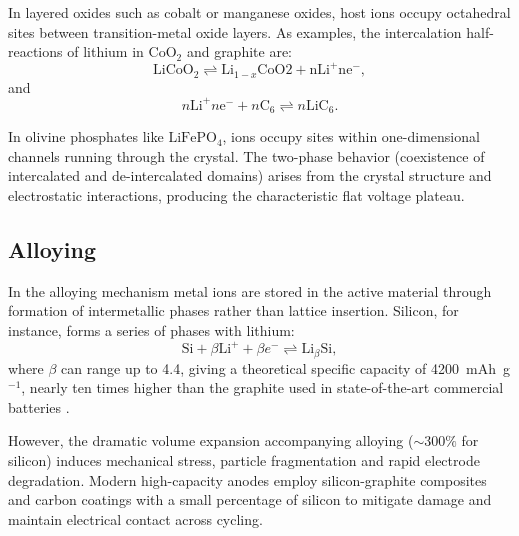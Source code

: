 In layered oxides such as cobalt or manganese oxides, host ions occupy octahedral sites between transition-metal oxide layers. 
As examples, the intercalation half-reactions of lithium in $\mathrm{CoO}_2$ and graphite are\cite{MIZUSHIMA1980783}:
\begin{equation}
    \mathrm{LiCoO}_2 \rightleftharpoons \mathrm{Li}_{1-x}\mathrm{CoO2 + n\mathrm{Li}^+ n\mathrm{e}^-},
\end{equation} 
and
\begin{equation}
    n\mathrm{Li}^+ n\mathrm{e}^- +n\mathrm{C}_6 \rightleftharpoons n\mathrm{LiC}_6.
\end{equation}


In olivine phosphates like $\mathrm{LiFePO}_4$, ions occupy sites within one-dimensional channels running through the crystal. 
The two-phase behavior (coexistence of intercalated and de-intercalated domains) arises from the crystal structure and electrostatic interactions, producing the characteristic flat voltage plateau.

\subsection{Alloying}

In the alloying mechanism metal ions are stored in the active material through formation of intermetallic phases rather than lattice insertion. 
Silicon, for instance, forms a series of phases with lithium:
\begin{equation}
    \mathrm{Si} + \beta \mathrm{Li}^+ + \beta e^- \rightleftharpoons \mathrm{Li}_\beta \mathrm{Si},
\end{equation}
where $\beta$ can range up to 4.4, giving a theoretical specific capacity of 4200~mAh~g$^{-1}$, nearly ten times higher than the graphite used in state-of-the-art commercial batteries \cite{JAREER2025177124}.

However, the dramatic volume expansion accompanying alloying ($\sim 300\%$ for silicon) induces mechanical stress, particle fragmentation and rapid electrode degradation. 
Modern high-capacity anodes employ silicon-graphite composites and carbon coatings with a small percentage of silicon to mitigate damage and maintain electrical contact across cycling.

